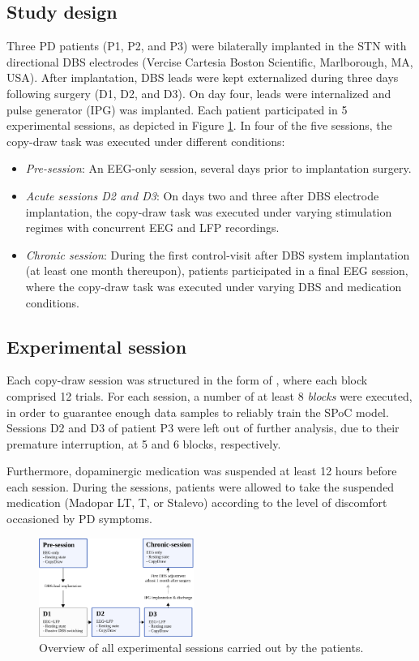\documentclass[10pt,a4paper, twocolumn]{article}
\begin{document}
\subsection{Study design}
Three PD patients (P1, P2, and P3) were bilaterally implanted in the STN with directional DBS electrodes (Vercise Cartesia \texttrademark Boston Scientific, Marlborough, MA, USA). After implantation, DBS leads were kept externalized during three days following surgery (D1, D2, and D3). On day four, leads were internalized and pulse generator (IPG) was implanted. Each patient participated in 5 experimental sessions, as depicted in Figure \ref{fig:sessions_overview}. In four of the five sessions, the copy-draw task was executed under different conditions:
\begin{itemize}
\item \textit{Pre-session}: An EEG-only session, several days prior to implantation surgery.
\item \textit{Acute sessions D2 and D3}: On days two and three after DBS electrode implantation, the copy-draw task was executed under varying stimulation regimes with concurrent EEG and LFP recordings.
\item \textit{Chronic session}: During the first control-visit after DBS system implantation (at least one month thereupon), patients participated in a final EEG session, where the copy-draw task was executed under varying DBS and medication conditions.
\end{itemize}

\subsection{Experimental session}
Each copy-draw session was structured in the form of , where each block comprised 12 trials. For each session, a number of at least 8 \textit{blocks} were executed, in order to guarantee enough data samples to reliably train the SPoC model. Sessions D2 and D3 of patient P3 were left out of further analysis, due to their premature interruption, at 5 and 6 blocks, respectively.

Furthermore, dopaminergic medication was suspended at least 12 hours before each session. During the sessions, patients were allowed to take the suspended medication (Madopar LT, T, or Stalevo) according to the level of discomfort occasioned by PD symptoms.

\begin{figure}[h!]
\centering
\includegraphics[width=0.45\textwidth]{figures/all_sessions}
\caption{Overview of all experimental sessions carried out by the patients.}
\label{fig:sessions_overview}
\end{figure}
\end{document}
